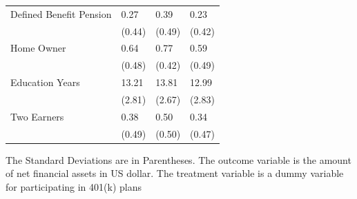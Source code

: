 \documentclass[
  12pt,
  12pt]{article}
\numberwithin{equation}{section}
\theoremstyle{definition}
\theoremstyle{plain}
\theoremstyle{plain}
\theoremstyle{remark}
\begin{document}
\begin{table}
{\begin{threeparttable}
\begin{tabular}{llll}
Defined Benefit Pension & 0.27          & 0.39         & 0.23             \\
                        & (0.44)        & (0.49)       & (0.42)           \\
Home Owner              & 0.64          & 0.77         & 0.59             \\
                        & (0.48)        & (0.42)       & (0.49)           \\
Education Years         & 13.21         & 13.81        & 12.99            \\
                        & (2.81)        & (2.67)       & (2.83)           \\ 
Two Earners             & 0.38          & 0.50         & 0.34             \\
                        & (0.49)        & (0.50)       & (0.47)           \\ \hline
\end{tabular}
\begin{tablenotes}
\footnotesize
\item The Standard Deviations are in Parentheses. The outcome variable is the amount of net financial assets in US dollar. The treatment variable is a dummy variable for participating in 401(k) plans
\end{tablenotes}
\end{threeparttable}

}

\end{table}%
\end{document}
